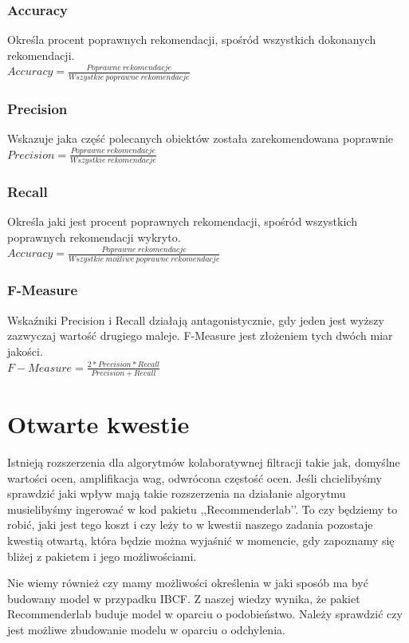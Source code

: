 \documentclass[12pt, a4paper]{article}
\begin{document}
\subsubsection{Accuracy}
Określa procent poprawnych rekomendacji, spośród wszystkich dokonanych rekomendacji.\\
$Accuracy = \frac{Poprawne\:rekomendacje}{Wszystkie \:poprawne\: rekomendacje}$
\subsubsection{Precision}
Wskazuje jaka część polecanych obiektów została zarekomendowana poprawnie\\
$Precision = \frac{Poprawne \:rekomendacje}{Wszystkie\: rekomendacje}$
\subsubsection{Recall}
Określa jaki jest procent poprawnych rekomendacji, spośród wszystkich poprawnych rekomendacji wykryto.\\
$Accuracy = \frac{Poprawne\:rekomendacje}{Wszystkie \:możliwe \:poprawne\: rekomendacje}$
\subsubsection{F-Measure}
Wskaźniki Precision i Recall działają antagonistycznie, gdy jeden jest wyższy zazwyczaj wartość drugiego maleje. F-Measure jest złożeniem tych dwóch miar jakości.\\
$F-Measure = \frac{2*Precision*Recall}{Precision + Recall}$


\section{Otwarte kwestie}
Istnieją rozszerzenia dla algorytmów kolaboratywnej filtracji takie jak, domyślne wartości ocen, amplifikacja wag, odwrócona częstość ocen. Jeśli chcielibyśmy sprawdzić jaki wpływ mają takie rozszerzenia na działanie algorytmu musielibyśmy ingerować w kod pakietu ,,Recommenderlab’’. To czy będziemy to robić, jaki jest tego koszt i czy leży to w kwestii naszego zadania pozostaje kwestią otwartą, która będzie można wyjaśnić w momencie, gdy zapoznamy się bliżej z pakietem i jego możliwościami.

Nie wiemy również czy mamy możliwości określenia w jaki sposób ma być budowany model w przypadku IBCF. Z naszej wiedzy wynika, że pakiet Recommenderlab buduje model w oparciu o podobieństwo. Należy sprawdzić czy jest możliwe zbudowanie modelu w oparciu o odchylenia.
\end{document}
